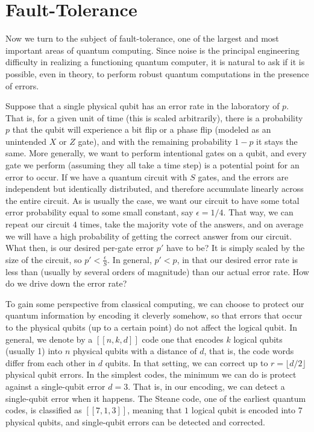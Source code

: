 \section{Fault-Tolerance}
\label{sec:ft}

Now we turn to the subject of fault-tolerance, one of the largest and most
important areas of quantum computing. Since noise is the principal engineering
difficulty in realizing a functioning quantum computer, it is natural to
ask if it is possible, even in theory, to perform robust quantum computations
in the presence of errors.

Suppose that a single physical qubit has an error rate in the laboratory of
$p$. That is, for a given unit of time (this is scaled arbitrarily),
there is a probability $p$ that the
qubit will experience a bit flip or a phase flip (modeled as an unintended
$X$ or $Z$ gate), and with the remaining probability $1-p$ it stays the same.
More generally, we want to perform intentional gates on a qubit, and every gate
we perform (assuming they all take a time step) is a potential point for an
error to occur. If we have a quantum circuit with $S$ gates, and the errors
are independent but identically distributed, and therefore accumulate
linearly across the entire circuit. As is usually the case, we want our circuit
to have some total error probability equal to some small constant, say
$\epsilon = 1/4$. That way, we can repeat our circuit $4$ times, take the majority vote
of the answers, and on average we will have a high probability of getting the
correct answer from our circuit. What then, is our desired per-gate error $p'$
have to be? It is simply scaled by the size of the circuit, so
$p' < \frac{\epsilon}{S}$. In general, $p' < p$, in that our desired
error rate is less than (usually by several orders of magnitude) than our
actual error rate. How do we drive down the error rate?

To gain some perspective from classical computing, we can choose to protect
our quantum information by encoding it cleverly somehow, so that
errors that occur to the physical qubits (up to a certain point) do not
affect the logical qubit. In general, we denote by a $[[n,k,d]]$ code one that
encodes $k$ logical qubits (usually 1) into $n$ physical qubits with a distance of
$d$, that is, the code words differ from each other in $d$ qubits. In that
setting, we can correct up to $r = \lfloor d/2 \rfloor$ physical qubit errors.
In the simplest codes, the minimum we can do is
protect against a single-qubit error $d=3$. That is, in our encoding, we can detect
a single-qubit error when it happens. The Steane code, one of the earliest
quantum codes, is classified as $[[7,1,3]]$, meaning that $1$ logical qubit
is encoded into $7$ physical qubits, and single-qubit errors can be detected
and corrected.


